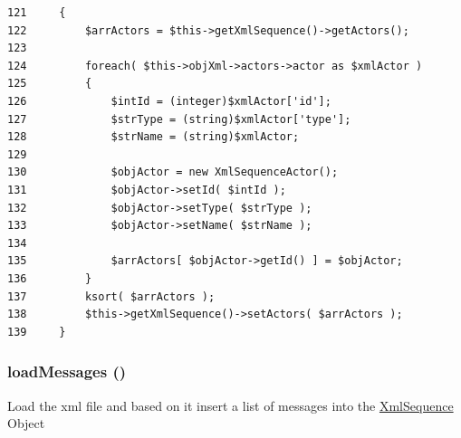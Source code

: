 \begin{Code}\begin{verbatim}121     {
122         $arrActors = $this->getXmlSequence()->getActors();
123         
124         foreach( $this->objXml->actors->actor as $xmlActor )
125         {
126             $intId = (integer)$xmlActor['id'];
127             $strType = (string)$xmlActor['type'];
128             $strName = (string)$xmlActor;
129 
130             $objActor = new XmlSequenceActor();
131             $objActor->setId( $intId );
132             $objActor->setType( $strType );
133             $objActor->setName( $strName );
134 
135             $arrActors[ $objActor->getId() ] = $objActor;
136         }
137         ksort( $arrActors );
138         $this->getXmlSequence()->setActors( $arrActors );
139     }
\end{verbatim}
\end{Code}


\hypertarget{class_xml_sequence_factory_xml_589f548f18802f9a10d0eaca5cab970c}{
\subsubsection[{loadMessages}]{\setlength{\rightskip}{0pt plus 5cm}loadMessages ()}}
\label{class_xml_sequence_factory_xml_589f548f18802f9a10d0eaca5cab970c}


Load the xml file and based on it insert a list of messages into the \hyperlink{class_xml_sequence}{XmlSequence} Object 

